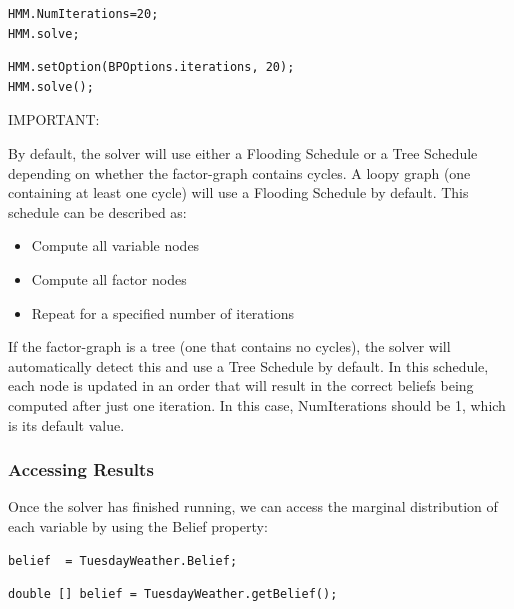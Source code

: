 \begin{lstlisting}
HMM.NumIterations=20;
HMM.solve;
\end{lstlisting}

\fi

\ifjava

\begin{lstlisting}
HMM.setOption(BPOptions.iterations, 20);
HMM.solve();
\end{lstlisting}

\fi

IMPORTANT:

By default, the solver will use either a Flooding Schedule or a Tree Schedule depending on whether the factor-graph contains cycles.  A loopy graph (one containing at least one cycle) will use a Flooding Schedule by default.  This schedule can be described as:

\begin{itemize}
\item Compute all variable nodes
\item Compute all factor nodes
\item Repeat for a specified number of iterations
\end{itemize}

If the factor-graph is a tree (one that contains no cycles), the solver will automatically detect this and use a Tree Schedule by default.  In this schedule, each node is updated in an order that will result in the correct beliefs being computed after just one iteration.  In this case, NumIterations should be 1, which is its default value.

\subsubsection*{Accessing Results}
Once the solver has finished running, we can access the marginal distribution of each variable by using the Belief property:

\ifmatlab

\begin{lstlisting}
belief  = TuesdayWeather.Belief;
\end{lstlisting}

\fi

\ifjava

\begin{lstlisting}
double [] belief = TuesdayWeather.getBelief();
\end{lstlisting}

\fi

